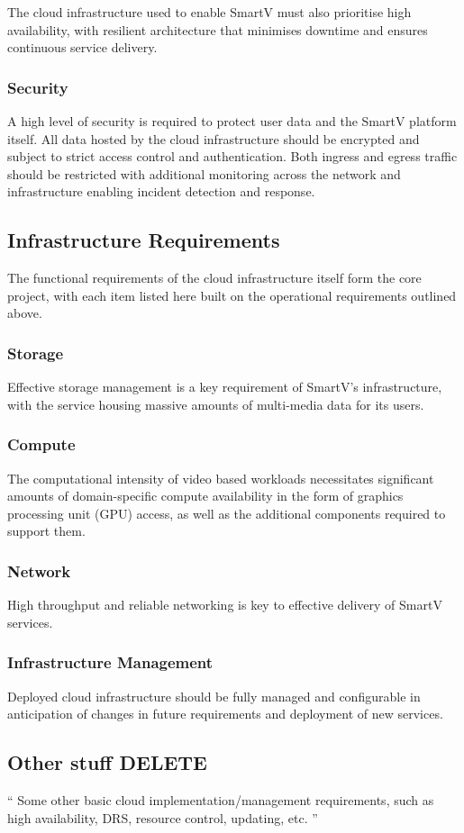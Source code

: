 The cloud infrastructure used to enable SmartV must also prioritise high availability, with resilient architecture that minimises downtime and ensures continuous service delivery. 

\subsubsection*{Security}

A high level of security is required to protect user data and the SmartV platform itself. All data hosted by the cloud infrastructure should be encrypted and subject to strict access control and authentication. Both ingress and egress traffic should be restricted with additional monitoring across the network and infrastructure enabling incident detection and response. 

\subsection{Infrastructure Requirements}

The functional requirements of the cloud infrastructure itself form the core project, with each item listed here built on the operational requirements outlined above.

\subsubsection*{Storage}

Effective storage management is a key requirement of SmartV's infrastructure, with the service housing massive amounts of multi-media data for its users.


\subsubsection*{Compute}

The computational intensity of video based workloads necessitates significant amounts of domain-specific compute availability in the form of graphics processing unit (GPU) access, as well as the additional components required to support them. 

\subsubsection*{Network}

High throughput and reliable networking is key to effective delivery of SmartV services.

\subsubsection*{Infrastructure Management}

Deployed cloud infrastructure should be fully managed and configurable in anticipation of changes in future requirements and deployment of new services.

\subsection{Other stuff DELETE}
`` Some other basic cloud implementation/management requirements, such as high availability, DRS,
resource control, updating, etc. ''